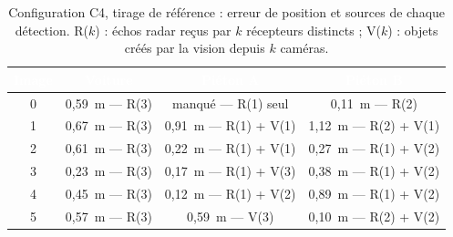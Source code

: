 \documentclass[12pt,a4paper,titlepage]{article}
\newcommand{\hd}[1]{\textcolor{white}{\textbf{#1}}}
\begin{document}
\begin{table}[H]
    \centering
    \caption{Configuration C4, tirage de référence : erreur de position et sources de chaque détection. R($k$) : échos radar reçus par $k$ récepteurs distincts ; V($k$) : objets créés par la vision depuis $k$ caméras.}
    \label{tab:frames_phase5}
    \begin{tabular}{cccc}
        \toprule
        \rowcolor{tabhead}
        \hd{Image} & \hd{Voiture} & \hd{Piéton A} & \hd{Piéton B} \\
        \midrule
        0 & 0,59~m --- R(3) & manqué --- R(1) seul & 0,11~m --- R(2) \\
        1 & 0,67~m --- R(3) & 0,91~m --- R(1) + V(1) & 1,12~m --- R(2) + V(1) \\
        2 & 0,61~m --- R(3) & 0,22~m --- R(1) + V(1) & 0,27~m --- R(1) + V(2) \\
        3 & 0,23~m --- R(3) & 0,17~m --- R(1) + V(3) & 0,38~m --- R(1) + V(2) \\
        4 & 0,45~m --- R(3) & 0,12~m --- R(1) + V(2) & 0,89~m --- R(1) + V(2) \\
        5 & 0,57~m --- R(3) & 0,59~m --- V(3) & 0,10~m --- R(2) + V(2) \\
        \bottomrule
    \end{tabular}
\end{table}
\end{document}

